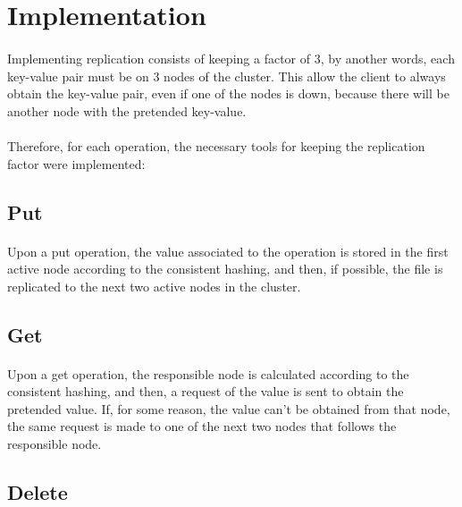 \documentclass{report}
\begin{document}
			\section{Implementation}
	
				\paragraph{} Implementing replication consists of keeping a factor 
				of 3, by another words, each key-value pair must be on 3 nodes of 
				the cluster. This allow the client to always obtain the key-value 
				pair, even if one of the nodes is down, because there will be another
				node with the pretended key-value. 

				\paragraph{} Therefore, for each operation, the necessary tools for 
				keeping the replication factor were implemented:
				
				\subsection{Put}
					\paragraph{} Upon a put operation, the value associated to the
					operation is stored in the first active node according to the 
					consistent hashing, and then, if possible, the file is replicated to 
					the next two active nodes in the cluster.

				\subsection{Get}
					\paragraph{} Upon a get operation, the responsible node is calculated
					according to the consistent hashing, and then, a request of the value
					is sent to obtain the pretended value. If, for some reason, the 
					value can't be obtained from that node, the same request 
					is made to one of the next two nodes that follows the responsible 
					node.

				\subsection{Delete}
\end{document}
